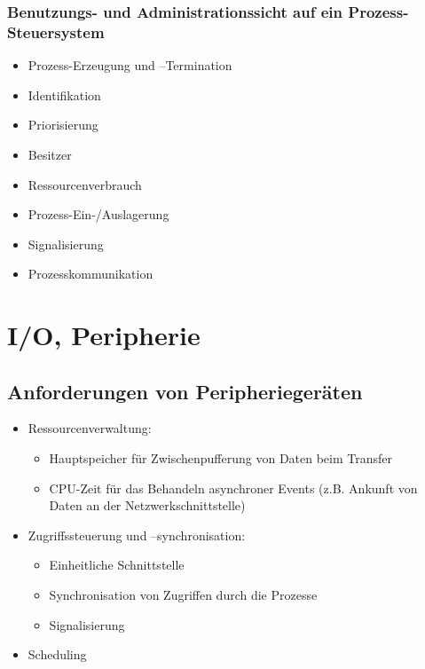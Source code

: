 \documentclass[a4paper, 10pt]{article}
\begin{document}
\subsubsection{Benutzungs- und Administrationssicht auf ein Prozess-Steuersystem}
\begin{itemize}
	\item Prozess-Erzeugung und –Termination
	\item Identifikation
	\item Priorisierung
	\item Besitzer	
	\item Ressourcenverbrauch
	\item Prozess-Ein-/Auslagerung
	\item Signalisierung
	\item Prozesskommunikation
\end{itemize}

\newpage
\section{I/O, Peripherie}
\subsection{Anforderungen von Peripheriegeräten}
\begin{itemize}
	\item Ressourcenverwaltung:
		\begin{itemize}
			\item Hauptspeicher für Zwischenpufferung von Daten beim Transfer
			\item CPU-Zeit für das Behandeln asynchroner Events (z.B. Ankunft von Daten an der Netzwerkschnittstelle)
		\end{itemize}
	\item Zugriffssteuerung und –synchronisation:
		\begin{itemize}
			\item Einheitliche Schnittstelle
			\item Synchronisation von Zugriffen durch die Prozesse
			\item Signalisierung
		\end{itemize}
	\item Scheduling
\end{itemize}
\end{document}

